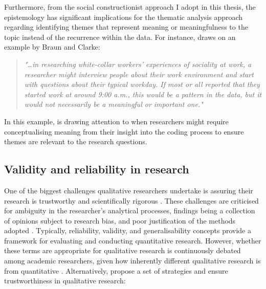 Furthermore, from the social constructionist approach I adopt in this thesis, the epistemology has significant implications for the thematic analysis approach regarding identifying themes that represent meaning or meaningfulness to the topic instead of the recurrence within the data. For instance, \cite{byrne2021worked} draws on an example by Braun and Clarke: 

\begin{quote}
\textit{"…in researching white-collar workers’ experiences of sociality at work, a researcher might interview people about their work environment and start with questions about their typical workday. If most or all reported that they started work at around 9:00 a.m., this would be a pattern in the data, but it would not necessarily be a meaningful or important one."} \citep[pg. 37]{braun2012thematic}
\end{quote}
In this example, \cite{byrne2021worked} is drawing attention to when researchers might require conceptualising meaning from their insight into the coding process to ensure themes are relevant to the research questions.

\subsection{Validity and reliability in research}
\label{TA:Reliability}
One of the biggest challenges qualitative researchers undertake is assuring their research is trustworthy and scientifically rigorous \citep{finlay2006rigour}. These challenges are criticised for ambiguity in the researcher's analytical processes, findings being a collection of opinions subject to research bias, and poor justification of the methods adopted \citep{rolfe2006validity}. Typically, reliability, validity, and generalisability concepts provide a framework for evaluating and conducting quantitative research. However, whether these terms are appropriate for qualitative research is continuously debated among academic researchers, given how inherently different qualitative research is from quantitative \citep{ryan2009rigour}. Alternatively, \cite{noble2015issues} propose a set of strategies and ensure trustworthiness in qualitative research:

